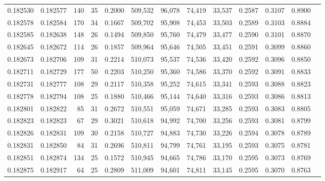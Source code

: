 \begin{tabular}{rrrrrrrrrrrrr}
0.182530 & 0.182577 &   140 &  35 &                                     0.2000 & 509,532 &  96,078 &  74,419 &  33,537 & 0.2587 & 0.3107 & 0.8900 \\
0.182578 & 0.182584 &   170 &  34 &                                     0.1667 & 509,702 &  95,908 &  74,453 &  33,503 & 0.2589 & 0.3103 & 0.8884 \\
0.182585 & 0.182638 &   148 &  26 &                                     0.1494 & 509,850 &  95,760 &  74,479 &  33,477 & 0.2590 & 0.3101 & 0.8870 \\
0.182645 & 0.182672 &   114 &  26 &                                     0.1857 & 509,964 &  95,646 &  74,505 &  33,451 & 0.2591 & 0.3099 & 0.8860 \\
0.182673 & 0.182706 &   109 &  31 &                                     0.2214 & 510,073 &  95,537 &  74,536 &  33,420 & 0.2592 & 0.3096 & 0.8850 \\
0.182711 & 0.182729 &   177 &  50 &                                     0.2203 & 510,250 &  95,360 &  74,586 &  33,370 & 0.2592 & 0.3091 & 0.8833 \\
0.182731 & 0.182777 &   108 &  29 &                                     0.2117 & 510,358 &  95,252 &  74,615 &  33,341 & 0.2593 & 0.3088 & 0.8823 \\
0.182778 & 0.182794 &   108 &  25 &                                     0.1880 & 510,466 &  95,144 &  74,640 &  33,316 & 0.2593 & 0.3086 & 0.8813 \\
0.182801 & 0.182822 &    85 &  31 &                                     0.2672 & 510,551 &  95,059 &  74,671 &  33,285 & 0.2593 & 0.3083 & 0.8805 \\
0.182823 & 0.182823 &    67 &  29 &                                     0.3021 & 510,618 &  94,992 &  74,700 &  33,256 & 0.2593 & 0.3081 & 0.8799 \\
0.182826 & 0.182831 &   109 &  30 &                                     0.2158 & 510,727 &  94,883 &  74,730 &  33,226 & 0.2594 & 0.3078 & 0.8789 \\
0.182831 & 0.182850 &    84 &  31 &                                     0.2696 & 510,811 &  94,799 &  74,761 &  33,195 & 0.2593 & 0.3075 & 0.8781 \\
0.182851 & 0.182874 &   134 &  25 &                                     0.1572 & 510,945 &  94,665 &  74,786 &  33,170 & 0.2595 & 0.3073 & 0.8769 \\
0.182875 & 0.182917 &    64 &  25 &                                     0.2809 & 511,009 &  94,601 &  74,811 &  33,145 & 0.2595 & 0.3070 & 0.8763 \\

\end{tabular}
